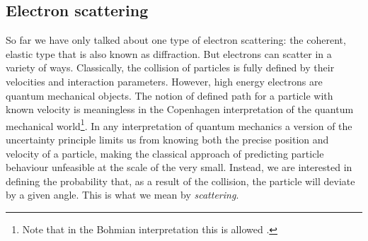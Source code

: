 \subsection{Electron scattering}
\label{sec:scatter}

So far we have only talked about one type of electron scattering: the coherent, elastic type that is also known as diffraction. But electrons can scatter in a variety of ways.  Classically, the collision of particles is fully defined by their velocities and interaction parameters. However, high energy electrons are quantum mechanical objects. The notion of defined path for a particle with known velocity is meaningless in the Copenhagen interpretation of the quantum mechanical world\footnote{Note that in the Bohmian interpretation this is allowed \cite{Cheng18}.}. In any interpretation of quantum mechanics a version of the uncertainty principle limits us from knowing both the precise position and velocity of a particle, making the classical approach of predicting particle behaviour unfeasible at the scale of the very small. Instead, we are interested in defining the probability that, as a result of the collision, the particle will deviate by a given angle. This is what we mean by \textit{scattering}.


